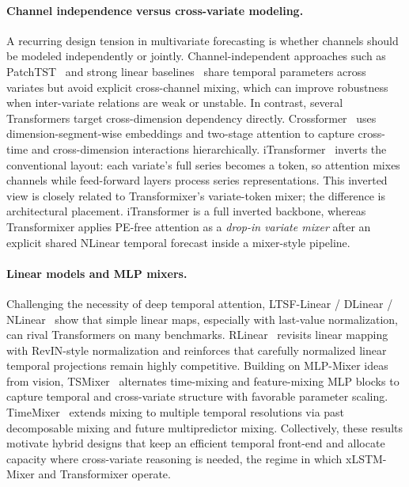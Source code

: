 \documentclass{article}
\begin{document}
\paragraph{Channel independence versus cross-variate modeling.}
A recurring design tension in multivariate forecasting is whether channels should be modeled independently or jointly.
Channel-independent approaches such as PatchTST~\citep{nie2023patchtst} and strong linear baselines~\citep{zeng2023dlinear,li2023rlinear} share temporal parameters across variates but avoid explicit cross-channel mixing, which can improve robustness when inter-variate relations are weak or unstable.
In contrast, several Transformers target cross-dimension dependency directly.
Crossformer~\citep{zhang2023crossformer} uses dimension-segment-wise embeddings and two-stage attention to capture cross-time and cross-dimension interactions hierarchically.
iTransformer~\citep{liu2024itransformer} inverts the conventional layout: each variate's full series becomes a token, so attention mixes channels while feed-forward layers process series representations.
This inverted view is closely related to Transformixer's variate-token mixer; the difference is architectural placement.
iTransformer is a full inverted backbone, whereas Transformixer applies PE-free attention as a \emph{drop-in variate mixer} after an explicit shared NLinear temporal forecast inside a mixer-style pipeline.

\paragraph{Linear models and MLP mixers.}
Challenging the necessity of deep temporal attention, LTSF-Linear / DLinear / NLinear~\citep{zeng2023dlinear} show that simple linear maps, especially with last-value normalization, can rival Transformers on many benchmarks.
RLinear~\citep{li2023rlinear} revisits linear mapping with RevIN-style normalization and reinforces that carefully normalized linear temporal projections remain highly competitive.
Building on MLP-Mixer ideas from vision, TSMixer~\citep{chen2023tsmixer} alternates time-mixing and feature-mixing MLP blocks to capture temporal and cross-variate structure with favorable parameter scaling.
TimeMixer~\citep{wang2024timemixer} extends mixing to multiple temporal resolutions via past decomposable mixing and future multipredictor mixing.
Collectively, these results motivate hybrid designs that keep an efficient temporal front-end and allocate capacity where cross-variate reasoning is needed, the regime in which xLSTM-Mixer and Transformixer operate.
\end{document}

